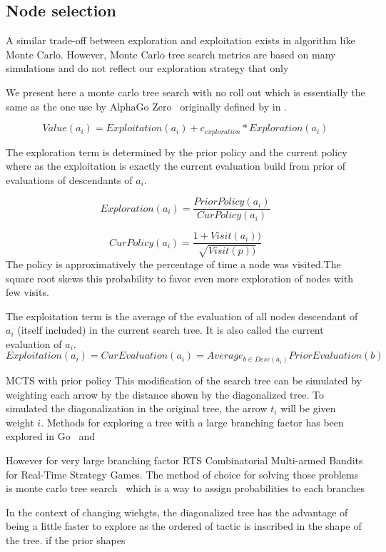 \documentclass[runningheads,a4paper,draft]{svjour3}
\begin{document}
\subsection{Node selection}

A similar trade-off between exploration and exploitation exists in algorithm 
like Monte Carlo. However, Monte Carlo tree search metrics are based on many 
simulations and do not reflect our exploration strategy that only 


We present here a monte carlo tree search with no roll out which is essentially 
the same as the one use by AlphaGo Zero~\cite{} originally defined by \cite{} 
in \cite{}.

\[Value(a_i) = Exploitation(a_i) + c_{exploration} * Exploration(a_i)\] 

The exploration term is determined by the prior policy and the current policy 
where as the exploitation is exactly the current evaluation build from prior of 
evaluations of descendants of $a_i$.



\[Exploration(a_i) = \frac{PriorPolicy(a_i)}{CurPolicy(a_i)}\]

\[CurPolicy(a_i) = \frac{1 + Visit(a_i))}{\sqrt{Visit(p))}}\]
The policy is approximatively the  percentage of time a node was visited.The 
square root skews this probability to favor even more exploration of nodes with 
few visits. 

The exploitation term is the average of the evaluation of 
all nodes descendant of $a_i$ (itself included) in the current search tree. It 
is also called the current evaluation of $a_i$.   
\[Exploitation(a_i) = CurEvaluation(a_i) = 
  Average_{b \in Desc(a_i)} {PriorEvaluation(b)}\]


MCTS with prior policy
This modification of the search tree can be simulated by weighting each arrow 
by the distance shown by the diagonalized tree. To simulated the 
diagonalization in the original tree, the arrow $t_i$ will be given weight $i$.
Methods for exploring a tree with a large branching factor has been explored  
in Go~\cite{alphago} and 

However for very large branching factor RTS Combinatorial Multi-armed Bandits
for Real-Time Strategy Games. The method of choice for solving those 
problems 
is monte carlo tree search~\cite{mcts} which is a way to assign probabilities 
to each branches

In the context of changing wiehgts, the diagonalized tree has the advantage of 
being a little faster to explore as the ordered of tactic is inscribed in the 
shape of the tree. if the prior shapes 
\end{document}
